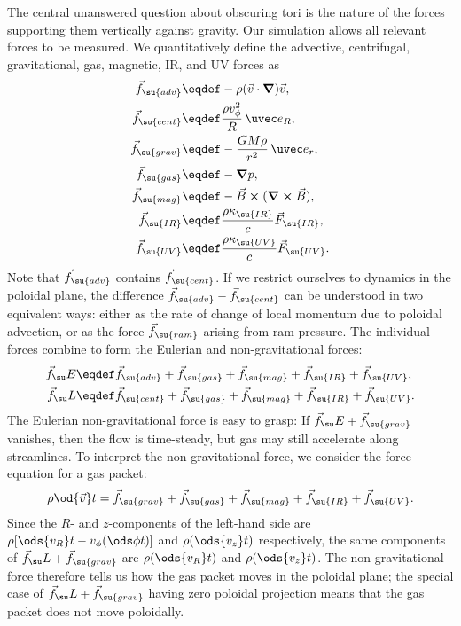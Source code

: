 \documentclass[twocolumn]{article}
\begin{document}
The central unanswered question about obscuring tori is the nature of the
forces supporting them vertically against gravity. Our simulation allows all
relevant forces to be measured. We quantitatively define the advective,
centrifugal, gravitational, gas, magnetic, \ac{IR}, and \ac{UV} forces as
\begin{align}
\vec f_\su{adv} &\eqdef -\rho (\vec v\cdot\grad)\vec v, \\
\label{eq:centrifugal force}
\vec f_\su{cent} &\eqdef \frac{\rho v_\phi^2}R\,\uvec e_R, \\
\vec f_\su{grav} &\eqdef -\frac{GM\rho}{r^2}\,\uvec e_r, \\
\label{eq:pressure force}
\vec f_\su{gas} &\eqdef -\grad p, \\
\vec f_\su{mag} &\eqdef -\vec B\cross(\curl\vec B), \\
\label{eq:IR force}
\vec f_\su{IR} &\eqdef \frac{\rho\kappa_\su{IR}}c\vec F_\su{IR}, \\
\vec f_\su{UV} &\eqdef \frac{\rho\kappa_\su{UV}}c\vec F_\su{UV}.
\end{align}
Note that $\vec f_\su{adv}$ contains $\vec f_\su{cent}$. If we restrict
ourselves to dynamics in the poloidal plane, the difference $\vec
f_\su{adv}-\vec f_\su{cent}$ can be understood in two equivalent ways: either
as the rate of change of local momentum due to poloidal advection, or as the
force $\vec f_\su{ram}$ arising from ram pressure. The individual forces
combine to form the Eulerian and  non-gravitational
forces:
\begin{align}
\label{eq:Eulerian force}
\vec f_\su E &\eqdef \vec f_\su{adv}
  +\vec f_\su{gas}+\vec f_\su{mag}+\vec f_\su{IR}+\vec f_\su{UV}, \\
\label{eq:Lagrangian force}
\vec f_\su L &\eqdef \vec f_\su{cent}
  +\vec f_\su{gas}+\vec f_\su{mag}+\vec f_\su{IR}+\vec f_\su{UV}.
\end{align}
The Eulerian non-gravitational force is easy to grasp: If $\vec f_\su E+\vec
f_\su{grav}$ vanishes, then the flow is time-steady, but gas may still
accelerate along streamlines. To interpret the 
non-gravitational force, we consider the force equation for a gas packet:
\begin{equation}
\rho\od{\vec v}t=\vec f_\su{grav}
  +\vec f_\su{gas}+\vec f_\su{mag}+\vec f_\su{IR}+\vec f_\su{UV}.
\end{equation}
Since the $R$- and $z$\nobreakdash-components of the left-hand side are $\rho
[\ods{v_R}t-v_\phi (\ods\phi t)]$ and $\rho (\ods{v_z}t)$ respectively, the
same components of $\vec f_\su L+\vec f_\su{grav}$ are $\rho (\ods{v_R}t)$ and
$\rho (\ods{v_z}t)$. The  non-gravitational force
therefore tells us how the gas packet moves in the poloidal plane; the special
case of $\vec f_\su L+\vec f_\su{grav}$ having zero poloidal projection means
that the gas packet does not move poloidally.
\end{document}
